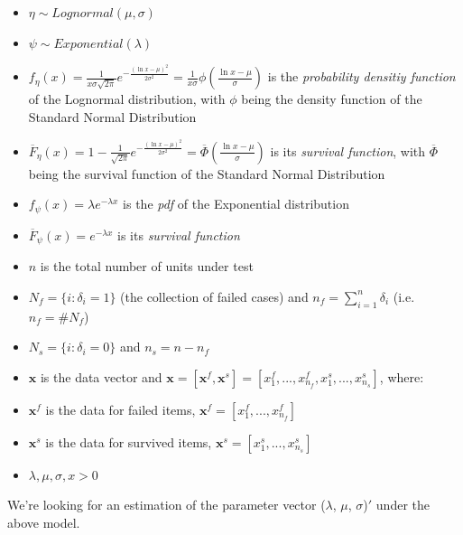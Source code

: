 \documentclass{article}
\begin{document}
\begin{itemize}
\item $\eta \sim Lognormal(\mu, \sigma)$ 
\item $\psi \sim Exponential(\lambda)$
\item $f_\eta(x) = \frac{1}{x \sigma \sqrt{2 \pi}} e^{-\frac{\left( \ln x - \mu \right)^2}{2\sigma^2}} = \frac{1}{x \sigma} \phi \left( \frac{\ln x - \mu}{\sigma} \right) $ is the \textit{probability densitiy function} of the Lognormal distribution, with $\phi$ being the density function of the Standard Normal Distribution
\item $\overline F_\eta(x) = 1 - \frac{1}{\sqrt{2 \pi}} e^{-\frac{\left( \ln x - \mu \right)^2}{2\sigma^2}} = \overline \Phi \left(\frac{\ln x - \mu}{\sigma}\right)$ is its \textit{survival function}, with $\overline\Phi$ being the survival function of the Standard Normal Distribution
\item $f_\psi(x) = \lambda e^{- \lambda x}$ is the \textit{pdf} of the Exponential distribution 
\item $\overline F_\psi(x) = e^{- \lambda x}$ is its \textit{survival function}
\item $n$ is the total number of units under test
\item $N_f = \{i : \delta_i = 1 \}$ (the collection of failed cases) and $n_f  = \sum_{i=1}^n \delta_i$ (i.e. $n_f = \# N_f$)
\item $N_s = \{i : \delta_i = 0 \}$ and $n_s  = n - n_f$
\item $\textbf{x}$ is the data vector and $\textbf{x} = \left[ \textbf{x}^f, \textbf{x}^s \right] = \left[ x_1^f, ... , x_{n_f}^f, x_1^s, ... , x_{n_s}^s \right] $, where:
\item $\textbf{x}^f$ is the data for failed items, $\textbf{x}^f = \left[ x_1^f, ... , x_{n_f}^f \right] $
\item $\textbf{x}^s$ is the data for survived items, $\textbf{x}^s = \left[ x_1^s, ... , x_{n_s}^s \right] $
\item $\lambda, \mu, \sigma, x > 0$
\end{itemize}
\indent We're looking for an estimation of the parameter vector ($\lambda$, $\mu$, $\sigma$)$'$ under the above model. 
\end{document}
